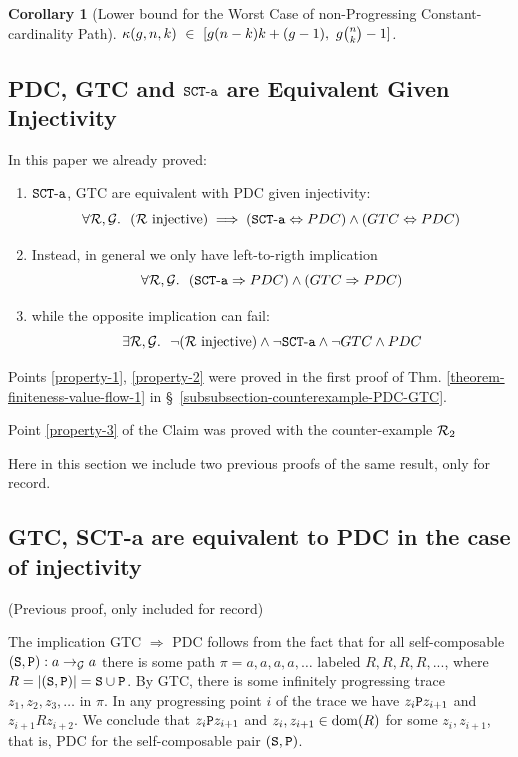 \documentclass{lmcs}
\newtheorem{corollary}[theorem]{Corollary}
\begin{document}
\begin{corollary}[Lower bound for the Worst Case of 
non-Progressing Constant-cardinality Path]
$\kappa(g,n,k) \ \in \ [ g(n-k)k+(g-1),  \ g  \newton{n}{k}-1 ]$.
\end{corollary}



\subsection{PDC, GTC and $\SCTa$ are Equivalent Given Injectivity}
\label{subsection-equivalent-SCTa}

In this paper we already proved:
\begin{enumerate}
\item
\label{property-1}
$\SCTa$, GTC are equivalent with PDC given injectivity:
$$
\forall \setR, \setG.  \ \ 
(\setR \mbox{ injective}) 
\implies 
(\SCTa \Leftrightarrow PDC) \wedge 
(GTC \Leftrightarrow PDC)
$$
\item
\label{property-2}
Instead, in general we only have left-to-rigth implication
$$
\forall \setR, \setG.  \ \ 
(\SCTa \Rightarrow PDC) \wedge 
(GTC \Rightarrow PDC)
$$
\item
\label{property-3}
while the opposite implication can fail:
$$
\exists \setR, \setG. \ \ 
\neg(\setR \mbox{ injective}) \wedge 
\neg \SCTa \wedge 
\neg GTC \wedge 
PDC
$$
\end{enumerate}

Points \ref{property-1}, \ref{property-2} were proved in the first
proof of Thm. \ref{theorem-finiteness-value-flow-1}
in \S \ \ref{subsubsection-counterexample-PDC-GTC}.

Point \ref{property-3} of the Claim
was proved with the counter-example $\setR_2$

Here in this section we include two previous proofs of the same result, only for record.

\subsection{GTC, SCT-a are equivalent to PDC in the case of injectivity}(Previous proof, only
included for record)
\label{subsection-SCT-PDC}

The implication GTC $\Rightarrow$ PDC follows from the fact that
for all self-composable $\composable{\setG}{a}{a}{(\Stat,\Prog)}$ 
there is some path $\pi = a,a,a,a,\ldots$ labeled $R,R,R,R,...$,
where $R = \universe{(\Stat,\Prog)} = \Stat \cup \Prog$. By GTC,
there is some infinitely progressing trace $z_1,z_2,z_3,\ldots$ in $\pi$.  
In any progressing point $i$ of the trace we have $z_i \Prog z_{i+1}$
and $z_{i+1} R z_{i+2}$. We conclude that $z_i \Prog z_{i+1}$
and $z_i, z_{i+1} \in \dom(R)$ for some $z_i, z_{i+1}$, that is,
PDC for the self-composable pair $(\Stat,\Prog)$.
\\
\end{document}

